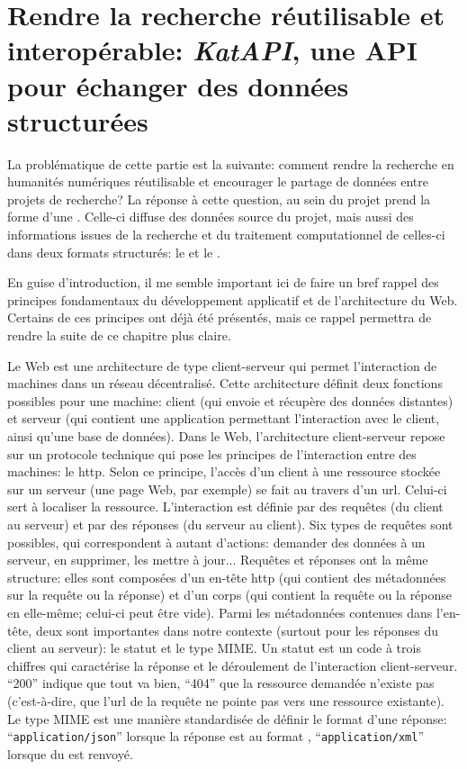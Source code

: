 
\part{Rendre la recherche réutilisable et interopérable: \textit{KatAPI}, une API pour échanger des données structurées}

La problématique de cette partie est la suivante: comment rendre la recherche en humanités numériques réutilisable et encourager le partage de données entre projets de recherche? La réponse à cette question, au sein du projet \mssktb{} prend la forme d'une \api{}. Celle-ci diffuse des données source du projet, mais aussi des informations issues de la recherche et du traitement computationnel de celles-ci dans deux formats structurés: le \json{} et le \xmltei{}.

En guise d'introduction, il me semble important ici de faire un bref rappel des principes fondamentaux du développement applicatif et de l'architecture du Web. Certains de ces principes ont déjà été présentés, mais ce rappel permettra de rendre la suite de ce chapitre plus claire.

Le Web est une architecture de type client-serveur qui permet l'interaction de machines dans un réseau décentralisé. Cette architecture définit deux fonctions possibles pour une machine: client (qui envoie et récupère des données distantes) et serveur (qui contient une application permettant l'interaction avec le client, ainsi qu'une base de données). Dans le Web, l'architecture client-serveur repose sur un protocole technique qui pose les principes de l'interaction entre des machines: le \gls{http}. Selon ce principe, l'accès d'un client à une ressource stockée sur un serveur (une page Web, par exemple) se fait au travers d'un \gls{url}. Celui-ci sert à localiser la ressource. L'interaction est définie par des requêtes (du client au serveur) et par des réponses (du serveur au client). Six types de requêtes sont possibles, qui correspondent à autant d'actions: demander des données à un serveur, en supprimer, les mettre à jour... Requêtes et réponses ont la même structure: elles sont composées d'un en-tête \gls{http} (qui contient des métadonnées sur la requête ou la réponse) et d'un corps (qui contient la requête ou la réponse en elle-même; celui-ci peut être vide). Parmi les métadonnées contenues dans l'en-tête, deux sont importantes dans notre contexte (surtout pour les réponses du client au serveur): le statut et le type MIME. Un statut est un code à trois chiffres qui caractérise la réponse et le déroulement de l'interaction client-serveur. \enquote{200} indique que tout va bien, \enquote{404} que la ressource demandée n'existe pas (c'est-à-dire, que l'\gls{url} de la requête ne pointe pas vers une ressource existante). Le type MIME est une manière standardisée de définir le format d'une réponse: \enquote{\texttt{application/json}} lorsque la réponse est au format \json{}, \enquote{\texttt{application/xml}} lorsque du \xml{} est renvoyé.

